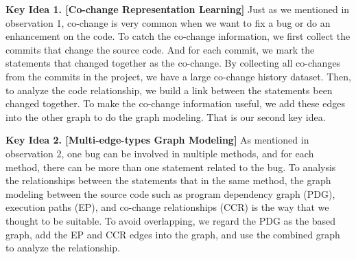 

{\bf Key Idea 1. [Co-change Representation Learning]} Just as we mentioned in observation 1, co-change is very common when we want to fix a bug or do an enhancement on the code. To catch the co-change information, we first collect the commits that change the source code. And for each commit, we mark the statements that changed together as the co-change. By collecting all co-changes from the commits in the project, we have a large co-change history dataset. Then, to analyze the code relationship, we build a link between the statements been changed together. To make the co-change information useful, we add these edges into the other graph to do the graph modeling. That is our second key idea.

{\bf Key Idea 2. [Multi-edge-types Graph Modeling]} As mentioned in observation 2, one bug can be involved in multiple methods, and for each method, there can be more than one statement related to the bug. To analysis the relationships between the statements that in the same method, the graph modeling between the source code such as program dependency graph (PDG), execution paths (EP), and co-change relationships (CCR) is the way that we thought to be suitable. To avoid overlapping, we regard the PDG as the based graph, add the EP and CCR edges into the graph, and use the combined graph to analyze the relationship. 


